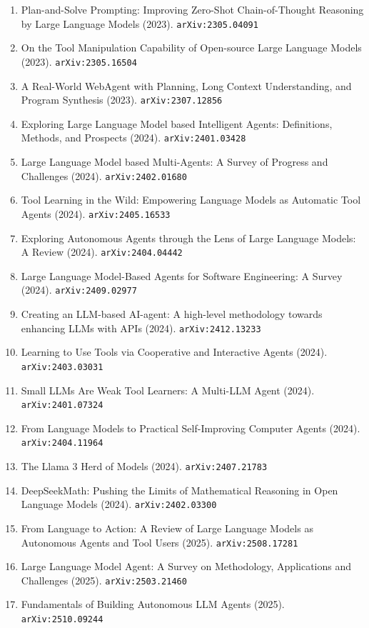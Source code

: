 \documentclass[11pt]{article}
\begin{document}
\begin{enumerate}
  models (2023). \texttt{arXiv:2303.09014}
  \item Plan-and-Solve Prompting: Improving Zero-Shot Chain-of-Thought Reasoning
  by Large Language Models (2023). \texttt{arXiv:2305.04091}
  \item On the Tool Manipulation Capability of Open-source Large Language Models (2023). \texttt{arXiv:2305.16504}
  \item A Real-World WebAgent with Planning, Long Context Understanding, and
  Program Synthesis (2023). \texttt{arXiv:2307.12856}
  \item Exploring Large Language Model based Intelligent Agents: Definitions,
  Methods, and Prospects (2024). \texttt{arXiv:2401.03428}
  \item Large Language Model based Multi-Agents: A Survey of Progress and
  Challenges (2024). \texttt{arXiv:2402.01680}
  \item Tool Learning in the Wild: Empowering Language Models as Automatic Tool
  Agents (2024). \texttt{arXiv:2405.16533}
  \item Exploring Autonomous Agents through the Lens of Large Language Models: A
  Review (2024). \texttt{arXiv:2404.04442}
  \item Large Language Model-Based Agents for Software Engineering: A Survey (2024). \texttt{arXiv:2409.02977}
  \item Creating an LLM-based AI-agent: A high-level methodology towards
  enhancing LLMs with APIs (2024). \texttt{arXiv:2412.13233}
  \item Learning to Use Tools via Cooperative and Interactive Agents (2024). \texttt{arXiv:2403.03031}
  \item Small LLMs Are Weak Tool Learners: A Multi-LLM Agent (2024). \texttt{arXiv:2401.07324}
  \item From Language Models to Practical Self-Improving Computer Agents (2024). \texttt{arXiv:2404.11964}
  \item The Llama 3 Herd of Models (2024). \texttt{arXiv:2407.21783}
  \item DeepSeekMath: Pushing the Limits of Mathematical Reasoning in Open
  Language Models (2024). \texttt{arXiv:2402.03300}
  \item From Language to Action: A Review of Large Language Models as Autonomous Agents and Tool Users (2025). \texttt{arXiv:2508.17281}
  \item Large Language Model Agent: A Survey on Methodology, Applications and
  Challenges (2025). \texttt{arXiv:2503.21460}
  \item Fundamentals of Building Autonomous LLM Agents (2025). \texttt{arXiv:2510.09244}

\end{enumerate}
\end{document}
